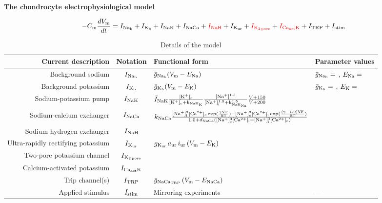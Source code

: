 \documentclass{article}
\begin{document}
\centering

{\Large \bf The chondrocyte electrophysiological model\\}

\large
\pagestyle{empty}
\begin{displaymath}
-C_{\rm m} \frac{dV_{\rm m}}{dt} = I_{\rm Na_b} + I_{\rm K_b}
                               + I_{\rm NaK} + I_{\rm NaCa}
                               + \textcolor{missing}{I_{\rm NaH}} + I_{\rm K_{ur}}
                               + \textcolor{missing}{I_{\rm K_{2\, pore}}}
                               + \textcolor{missing}{I_{\rm Ca_{act}K}}
                               + I_{\rm TRP} + I_{\rm stim}
\end{displaymath}

\begin{table}[ht]
\large
\centering
\begin{tabular}{r c l l}
\hline\hline
Current description & Notation & Functional form & Parameter values \\ [0.5ex]
\hline
Background sodium & $I_{\rm Na_b}$ & $\bar{g}_{\rm Na_b} (V_{\rm m} - E_{\rm Na})$ \cite{UNKNOWN}
                          & $\bar{g}_{\rm Na_b} = $ \cite{UNKNOWN}, $E_{\rm Na} = $ \cite{UNKNOWN}\\
Background potassium & $I_{\rm K_b}$ & $\bar{g}_{\rm K_b} (V_{\rm m} - E_{\rm K})$ \cite{UNKNOWN}
                          & $\bar{g}_{\rm K_b} = $ \cite{UNKNOWN}, $E_{\rm K} = $ \cite{UNKNOWN}\\
Sodium-potassium pump & $I_{\rm NaK}$ & $\bar{I}_{\rm NaK}
\frac{[\rm K^{+}]_{\rm c}}{[\rm K^{+}]_{\rm c} + k_{\rm NaK_{K}}}
\frac{[\rm Na^{+}]^{1.5}_{\rm i}}{[\rm Na^{+}]^{1.5}_{\rm i} + k^{1.5}_{\rm
    NaK_{Na}}}
\frac{V + 150}{V + 200}$\cite{Nygrenetal1998} & \cite{Nygrenetal1998}\\
Sodium-calcium exchanger & $I_{\rm NaCa}$ & $k_{\rm NaCa}
\frac{[\rm Na^{+}]^{3}_{i}[\rm Ca^{2+}]_{c} \exp(\frac{\gamma V F}{R T}) -
[\rm Na^{+}]^{3}_{c}[\rm Ca^{2+}]_{i} \exp(\frac{(\gamma - 1.0) V F}{R T})}
{1.0 + d_{\rm NaCa}([\rm Na^{+}]^{3}_{c}[\rm Ca^{2+}]_{i} + [\rm
  Na^{+}]^{3}_{i}[\rm Ca^{2+}]_{c})}$
\cite{Nygrenetal1998} & \cite{Nygrenetal1998}\\
Sodium-hydrogen exchanger & $I_{\rm NaH}$ & \cite{UNKNOWN} & \cite{UNKNOWN}\\
Ultra-rapidly rectifying potassium & $I_{\rm K_{ur}}$ & $g_{\rm
  K_{ur}}\, a_{\rm ur}\, i_{\rm ur}\, (V_{\rm m} - E_{\rm K})$ \cite{Maleckaretal2009} & \cite{Maleckaretal2009}\\
Two-pore potassium channel & $I_{\rm K_{2\, pore}}$ & \cite{UNKNOWN} & \cite{UNKNOWN}\\
Calcium-activated potassium & $I_{\rm Ca_{act}K}$ & \cite{UNKNOWN} & \cite{UNKNOWN}\\
Trip channel(s) & $I_{\rm TRP}$ & $\bar{g}_{\rm NaCa_{TRP}}\, (V_{\rm
  m} - E_{\rm NaCa})$ \cite{UNKNOWN} & \cite{UNKNOWN}\\
Applied stimulus & $ I_{\rm stim}$ & Mirroring experiments \cite{Clarketal2011} &  --- \\ [1ex]
\hline
\end{tabular}
\caption{Details of the model}
\label{table:chondrocyte-model-details}
\end{table}
\end{document}
